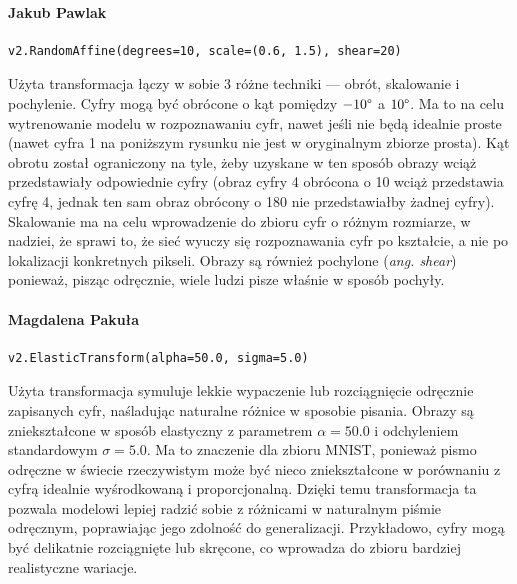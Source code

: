 \documentclass[10pt]{article}
\begin{document}
\begin{multicols}{2}
    \paragraph{Jakub Pawlak}
    \small
    \begin{verbatim}
v2.RandomAffine(degrees=10, scale=(0.6, 1.5), shear=20)
    \end{verbatim}
    \normalsize
    Użyta transformacja łączy w sobie 3 różne techniki --- obrót, skalowanie i pochylenie.
    Cyfry mogą być obrócone o kąt pomiędzy $-10\degree$ a $10\degree$.
    Ma to na celu wytrenowanie modelu w rozpoznawaniu cyfr, nawet jeśli nie będą idealnie proste (nawet cyfra 1 na poniższym rysunku nie jest w oryginalnym zbiorze prosta).
    Kąt obrotu został ograniczony na tyle, żeby uzyskane w ten sposób obrazy wciąż przedstawiały odpowiednie cyfry (obraz cyfry 4 obrócona o 10\textdegree{} wciąż przedstawia cyfrę 4, jednak ten sam obraz obrócony o 180\textdegree{} nie przedstawiałby żadnej cyfry).
    Skalowanie ma na celu wprowadzenie do zbioru cyfr o różnym rozmiarze, w nadziei, że sprawi to, że sieć wyuczy się rozpoznawania cyfr po kształcie, a nie po lokalizacji konkretnych pikseli.
    Obrazy są również pochylone (\emph{ang. shear}) ponieważ, pisząc odręcznie, wiele ludzi pisze właśnie w sposób pochyły.
    \newcolumn{}
    \paragraph{Magdalena Pakuła}
    \small
    \begin{verbatim}
v2.ElasticTransform(alpha=50.0, sigma=5.0)
    \end{verbatim}
    \normalsize
    Użyta transformacja symuluje lekkie wypaczenie lub rozciągnięcie odręcznie zapisanych cyfr, naśladując naturalne różnice w sposobie pisania.
    Obrazy są zniekształcone w sposób elastyczny z parametrem $\alpha=50.0$ i odchyleniem standardowym $\sigma=5.0$.
    Ma to znaczenie dla zbioru MNIST, ponieważ pismo odręczne w świecie rzeczywistym może być nieco zniekształcone w porównaniu z cyfrą idealnie wyśrodkowaną i proporcjonalną.
    Dzięki temu transformacja ta pozwala modelowi lepiej radzić sobie z różnicami w naturalnym piśmie odręcznym, poprawiając jego zdolność do generalizacji.
    Przykładowo, cyfry mogą być delikatnie rozciągnięte lub skręcone, co wprowadza do zbioru bardziej realistyczne wariacje.
\end{multicols}
\end{document}
